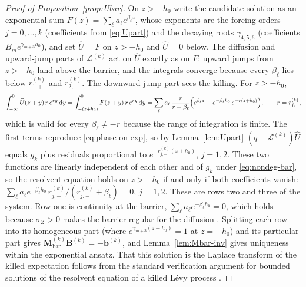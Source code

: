 \documentclass[11pt]{article}
\newcommand{\diff}{\mathrm{d}}
\theoremstyle{plain}
\theoremstyle{definition}
\theoremstyle{remark}
\begin{document}
\begin{proof}[Proof of Proposition~\ref{prop:Ubar}]\label{proof:prop:Ubar}
On $z>-h_0$ write the candidate solution as an exponential sum $F(z)=\sum_\ell a_\ell e^{\beta_\ell z}$,
whose exponents are the forcing orders $j=0,\dots,k$ (coefficients from \eqref{eq:Upart}) and the
decaying roots $\gamma_{4,5,6}$ (coefficients $B_m e^{\gamma_{m+3}h_0}$), and set $\widehat U=F$ on
$z>-h_0$ and $\widehat U=0$ below. The diffusion and upward-jump parts of $\mathcal L^{(k)}$ act on
$\widehat U$ exactly as on $F$: upward jumps from $z>-h_0$ land above the barrier, and the integrals
converge because every $\beta_\ell$ lies below $r_{1,+}^{(k)}$ and $r_{2,+}^{(k)}$. The downward-jump
part sees the killing. For $z>-h_0$,
\[
\int_{-\infty}^{0}\widehat U(z+y)\,r\,e^{ry}\,\diff y
=\int_{-(z+h_0)}^{0}F(z+y)\,r\,e^{ry}\,\diff y
=\sum_\ell a_\ell\,\frac{r}{r+\beta_\ell}\Bigl(e^{\beta_\ell z}-e^{-\beta_\ell h_0}\,e^{-r(z+h_0)}\Bigr),
\qquad r=r_{j,-}^{(k)},
\]
which is valid for every $\beta_\ell\neq-r$ because the range of integration is finite. The first
terms reproduce \eqref{eq:phase-on-exp}, so by Lemma~\ref{lem:Upart} $(q-\mathcal L^{(k)})\widehat U$
equals $g_k$ plus residuals proportional to $e^{-r_{j,-}^{(k)}(z+h_0)}$, $j=1,2$. These two functions
are linearly independent of each other and of $g_k$ under \eqref{eq:nondeg-bar}, so the resolvent
equation holds on $z>-h_0$ if and only if both coefficients vanish:
$\sum_\ell a_\ell e^{-\beta_\ell h_0}\,r_{j,-}^{(k)}/(r_{j,-}^{(k)}+\beta_\ell)=0$, $j=1,2$. These are
rows two and three of the system. Row one is continuity at the barrier,
$\sum_\ell a_\ell e^{-\beta_\ell h_0}=0$, which holds because $\sigma_Z>0$ makes the barrier regular
for the diffusion \citep{KouWang2003,Sepp2004,AsmussenAvramPistorius2004}. Splitting each row into
its homogeneous part (where $e^{\gamma_{m+3}(z+h_0)}=1$ at $z=-h_0$) and its particular part gives
$\mathbf M_{\mathrm{bar}}^{(k)}\mathbf B^{(k)}=-\mathbf b^{(k)}$, and Lemma~\ref{lem:Mbar-inv} gives
uniqueness within the exponential ansatz. That this solution is the Laplace transform of the killed
expectation follows from the standard verification argument for bounded solutions of the resolvent
equation of a killed L\'evy process \citep{KouWang2003,AsmussenAvramPistorius2004}.
\end{proof}
\end{document}
